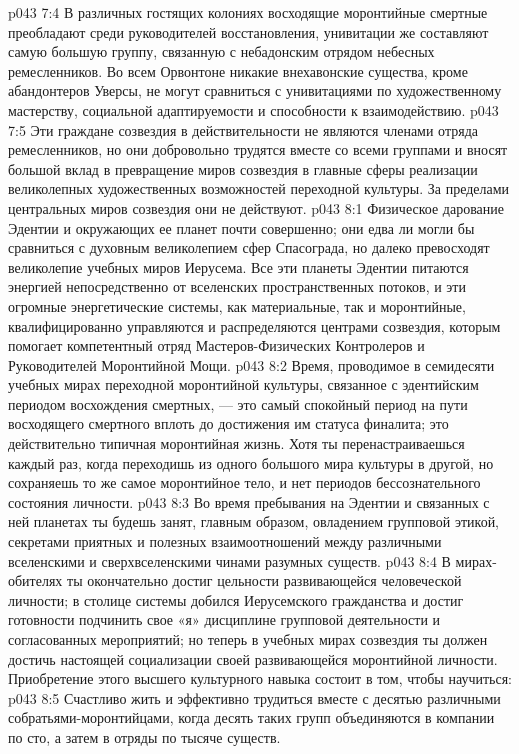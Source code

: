 \vs p043 7:4 В различных гостящих колониях восходящие моронтийные смертные преобладают среди руководителей восстановления, унивитации же составляют самую большую группу, связанную с небадонским отрядом небесных ремесленников. Во всем Орвонтоне никакие внехавонские существа, кроме абандонтеров Уверсы, не могут сравниться с унивитациями по художественному мастерству, социальной адаптируемости и способности к взаимодействию.
\vs p043 7:5 Эти граждане созвездия в действительности не являются членами отряда ремесленников, но они добровольно трудятся вместе со всеми группами и вносят большой вклад в превращение миров созвездия в главные сферы реализации великолепных художественных возможностей переходной культуры. За пределами центральных миров созвездия они не действуют.
\vs p043 8:1 Физическое дарование Эдентии и окружающих ее планет почти совершенно; они едва ли могли бы сравниться с духовным великолепием сфер Спасограда, но далеко превосходят великолепие учебных миров Иерусема. Все эти планеты Эдентии питаются энергией непосредственно от вселенских пространственных потоков, и эти огромные энергетические системы, как материальные, так и моронтийные, квалифицированно управляются и распределяются центрами созвездия, которым помогает компетентный отряд Мастеров\hyp{}Физических Контролеров и Руководителей Моронтийной Мощи.
\vs p043 8:2 Время, проводимое в семидесяти учебных мирах переходной моронтийной культуры, связанное с эдентийским периодом восхождения смертных, --- это самый спокойный период на пути восходящего смертного вплоть до достижения им статуса финалита; это действительно типичная моронтийная жизнь. Хотя ты перенастраиваешься каждый раз, когда переходишь из одного большого мира культуры в другой, но сохраняешь то же самое моронтийное тело, и нет периодов бессознательного состояния личности.
\vs p043 8:3 Во время пребывания на Эдентии и связанных с ней планетах ты будешь занят, главным образом, овладением групповой этикой, секретами приятных и полезных взаимоотношений между различными вселенскими и сверхвселенскими чинами разумных существ.
\vs p043 8:4 В мирах\hyp{}обителях ты окончательно достиг цельности развивающейся человеческой личности; в столице системы добился Иерусемского гражданства и достиг готовности подчинить свое «я» дисциплине групповой деятельности и согласованных мероприятий; но теперь в учебных мирах созвездия ты должен достичь настоящей социализации своей развивающейся моронтийной личности. Приобретение этого высшего культурного навыка состоит в том, чтобы научиться:
\vs p043 8:5 \bibnobreakspace Счастливо жить и эффективно трудиться вместе с десятью различными собратьями\hyp{}моронтийцами, когда десять таких групп объединяются в компании по сто, а затем в отряды по тысяче существ.
